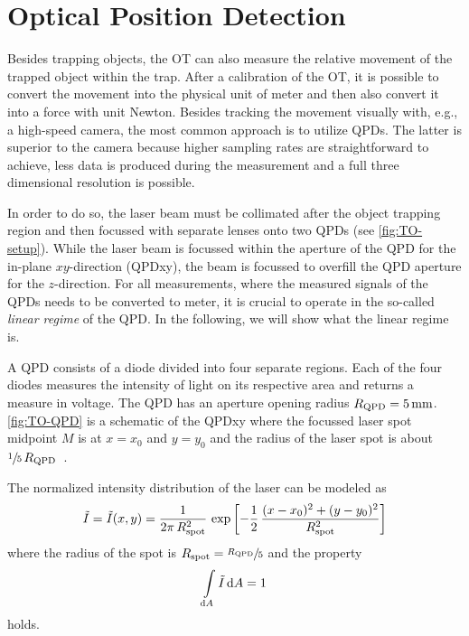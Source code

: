 \section{Optical Position Detection\label{sec:TO-QPD}}

Besides trapping objects, the OT can also measure the relative movement of the 
trapped object within the trap. After a calibration of the OT, it is possible 
to convert the movement into the physical unit of meter and then also convert 
it into a force with unit Newton. Besides tracking the movement visually with, 
e.g., a high-speed camera, the most common approach is to utilize QPDs. The 
latter is superior to the camera because higher sampling rates are 
straightforward to achieve, less data is produced during the measurement and a 
full three dimensional resolution is possible.

In order to do so, the laser beam must be collimated after the object trapping 
region and then focussed with separate lenses onto two QPDs (see 
\cref{fig:TO-setup}). While the laser beam is focussed within the aperture of 
the QPD for the in-plane $xy$-direction (QPDxy), the beam is focussed to 
overfill the QPD aperture for the $z$-direction. For all measurements, where 
the measured signals of the QPDs needs to be converted to meter, it is crucial 
to operate in the so-called \emph{linear regime} of the QPD. In the following, 
we will show what the linear regime is.

A QPD consists of a diode divided into four separate regions. Each of the four 
diodes measures the intensity of light on its respective area and returns a 
measure in voltage. The QPD has an aperture opening radius 
$R_{\MR{QPD}}=\SI{5}{\mm}$.  \cref{fig:TO-QPD} is a schematic of the QPDxy 
where the focussed laser spot midpoint $M$ is at $x=x_{0}$ and $y=y_{0}$ and 
the radius of the laser spot is about 
$\sfrac{1}{5}\,R_{\mathrm{QPD}}$~\cite{Lamprecht2017}.

The normalized intensity distribution of the laser can be modeled as
\begin{equation}
  \tilde{I} = \tilde{I}(x, y) = 
  \frac{1}{2\pi\,R_{\mathrm{spot}}^{2}}\,\exp\left[ 
  -\frac{1}{2}\,\frac{(x-x_{0})^{2} + (y - y_{0})^{2}}{R_{\mathrm{spot}}^{2}} 
\right]
    \label{eq:TO-intensity}
\end{equation}
where the radius of the spot is $R_{\mathrm{spot}}=\sfrac{R_{\mathrm{QPD}}}{5}$ and the property 
\begin{equation}
  \int\limits_{\dd{A}}\tilde{I}\dd{A} = 1
\end{equation}
holds.


